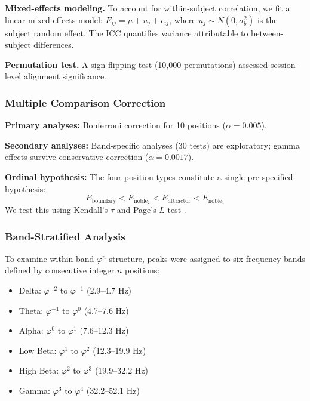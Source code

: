 \documentclass[11pt,a4paper]{article}
\newcommand{\phisym}{\varphi}
\begin{document}
\textbf{Mixed-effects modeling.} To account for within-subject correlation, we fit a linear mixed-effects model: $E_{ij} = \mu + u_j + \epsilon_{ij}$, where $u_j \sim N(0, \sigma^2_b)$ is the subject random effect. The ICC quantifies variance attributable to between-subject differences.

\textbf{Permutation test.} A sign-flipping test (10,000 permutations) assessed session-level alignment significance.

\subsubsection{Multiple Comparison Correction}

\textbf{Primary analyses:} Bonferroni correction for 10 positions ($\alpha = 0.005$).

\textbf{Secondary analyses:} Band-specific analyses (30 tests) are exploratory; gamma effects survive conservative correction ($\alpha = 0.0017$).

\textbf{Ordinal hypothesis:} The four position types constitute a single pre-specified hypothesis:
\begin{equation}
E_{\text{boundary}} < E_{\text{noble}_2} < E_{\text{attractor}} < E_{\text{noble}_1}
\label{eq:ordinal_hypothesis}
\end{equation}
\noindent We test this using Kendall's $\tau$ and Page's $L$ test \citep{abelson1963efficient}.

\subsubsection{Band-Stratified Analysis}
\label{sec:band_stratified_methods}

To examine within-band $\phisym^n$ structure, peaks were assigned to six frequency bands defined by consecutive integer $n$ positions:

\begin{itemize}
    \item Delta: $\phisym^{-2}$ to $\phisym^{-1}$ (2.9--4.7 Hz)
    \item Theta: $\phisym^{-1}$ to $\phisym^0$ (4.7--7.6 Hz)
    \item Alpha: $\phisym^0$ to $\phisym^1$ (7.6--12.3 Hz)
    \item Low Beta: $\phisym^1$ to $\phisym^2$ (12.3--19.9 Hz)
    \item High Beta: $\phisym^2$ to $\phisym^3$ (19.9--32.2 Hz)
    \item Gamma: $\phisym^3$ to $\phisym^4$ (32.2--52.1 Hz)
\end{itemize}
\end{document}
